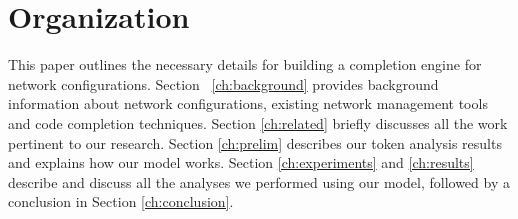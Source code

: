 \documentclass[../thesis.tex]{subfiles}
\begin{document}
\section{Organization}

This paper outlines the necessary details for building a completion engine for network configurations. Section ~\ref{ch:background} provides background information about network configurations, existing network management tools and code completion techniques. Section \ref{ch:related} briefly discusses all the work pertinent to our research. Section \ref{ch:prelim} describes our token analysis results and explains how our model works. Section \ref{ch:experiments} and \ref{ch:results} describe and discuss all the analyses we performed using our model, followed by a conclusion in Section \ref{ch:conclusion}.
\end{document}
